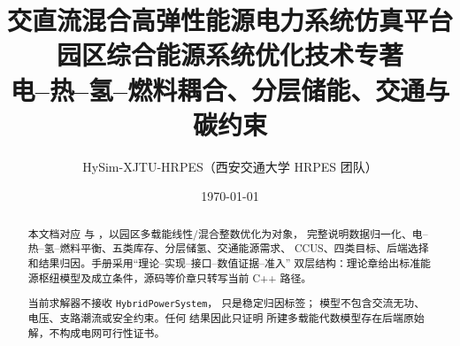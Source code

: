 \documentclass[UTF8,fontset=fandol,a4paper,11pt]{ctexart}
\title{\textbf{交直流混合高弹性能源电力系统仿真平台}\\[0.5em]
       {\Large 园区综合能源系统优化技术专著}\\[0.3em]
       {\large 电--热--氢--燃料耦合、分层储能、交通与碳约束}}
\author{HySim-XJTU-HRPES（西安交通大学 HRPES 团队）}
\date{\today}
\begin{document}
\maketitle
\begin{abstract}
本文档对应  与
，以园区多载能线性/混合整数优化为对象，
完整说明数据归一化、电--热--氢--燃料平衡、五类库存、分层储氢、交通能源需求、
CCUS、四类目标、后端选择和结果归因。手册采用“理论--实现--接口--数值证据--准入”
双层结构：理论章给出标准能源枢纽模型及成立条件，源码等价章只转写当前 C++ 路径。

当前求解器不接收 \texttt{HybridPowerSystem}， 只是稳定归因标签；
模型不包含交流无功、电压、支路潮流或安全约束。任何  结果因此只证明
所建多载能代数模型存在后端原始解，不构成电网可行性证书。
\end{abstract}

\tableofcontents
\newpage











\end{document}
